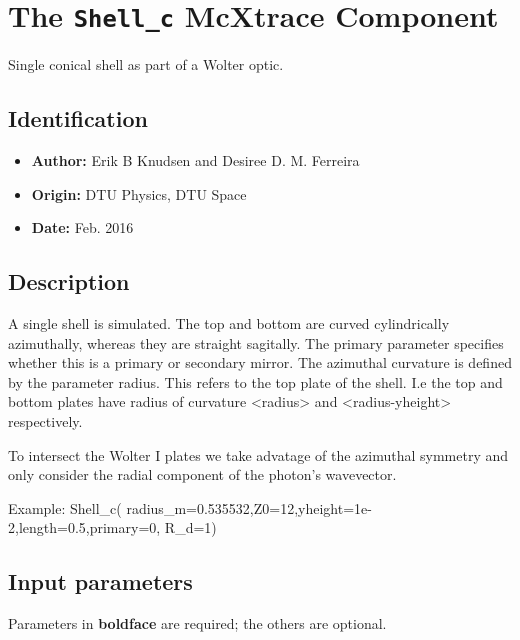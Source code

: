 \section{The \texttt{Shell\_c} McXtrace Component}
Single conical shell as part of a Wolter optic.

\subsection*{Identification}
\begin{itemize}
  \item \textbf{Author:} Erik B Knudsen and Desiree D. M. Ferreira
  \item \textbf{Origin:} DTU Physics, DTU Space
  \item \textbf{Date:} Feb. 2016
\end{itemize}

\subsection*{Description}
A single shell is simulated. The top and bottom are curved cylindrically azimuthally, whereas they are straight sagitally. The primary parameter specifies whether this is a primary or secondary mirror. The azimuthal curvature is defined by the parameter radius. This refers to the top plate of the shell. I.e the top and bottom plates have radius of curvature \textless{}radius\textgreater{} and \textless{}radius-yheight\textgreater{} respectively.

To intersect the Wolter I plates we take advatage of the azimuthal symmetry and only consider the radial component of the photon's wavevector.

Example: Shell\_c( radius\_m=0.535532,Z0=12,yheight=1e-2,length=0.5,primary=0, R\_d=1)

\subsection*{Input parameters}
Parameters in \textbf{boldface} are required; the others are optional.


